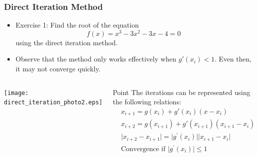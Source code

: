   \begin{frame}[fragile]
    \frametitle{Direct Iteration Method}
  
    \begin{itemize}
      \item Exercise 1: Find the root of the equation
        \[
        f(x) = x^3 -3x^2 - 3x - 4 = 0
        \]
        using the direct iteration method.
      \item Observe that the method only works effectively when \(g'(x_i) < 1\). Even then, it may not converge quickly. 
    \end{itemize}
    \begin{columns}
    \texttt{[image: direct\_iteration\_photo2.eps]}
    \vspace{-0.5cm} 
    \begin{block}{Point}
      The iterations can be represented using the following relations:
      \begin{align*}
        & x_{i+1} = g(x_i) + g'(x_i)(x - x_i) \\
        & x_{i+2} = g(x_{i+1}) + g'(x_{i+1})(x_{i+1} - x_i) \\
        & \lvert x_{i+2} - x_{i+1} \rvert = \lvert g^\prime (x_i) \rvert \lvert x_{i+1} - x_i \rvert \\
        & \text{Convergence if } \lvert g^\prime (x_i) \rvert \leq 1
      \end{align*} 
    \end{block}    
    \end{columns}
  \end{frame}
  
